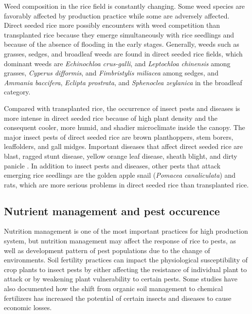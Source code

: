 \documentclass[12pt, oneside]{report}
\begin{document}
Weed composition in the rice field is constantly changing. Some weed species are favorably affected by production practice while some are adversely affected. Direct seeded rice more possibly encounters with weed competition than transplanted rice because they emerge simultaneously with rice seedlings and because of the absence of flooding in the early stages. Generally, weeds such as grasses, sedges, and broadleaf weeds are found in direct seeded rice fields, which dominant weeds are \textit{Echinochloa crus-galli}, and \textit{Leptochloa chinensis} among grasses, \textit{Cyperus difformis}, and \textit{Fimbristylis miliacea} among sedges, and \textit{Ammania baccifera}, \textit{Eclipta prostrata}, and \textit{Sphenoclea zeylanica} in the broadleaf category.

Compared with transplanted rice, the occurrence of insect pests and diseases is more intense in direct seeded rice because of high plant density and the consequent cooler, more humid, and shadier microclimate inside the canopy. The major insect pests of direct seeded rice are brown planthoppers, stem borers, leaffolders, and gall midges. Important diseases that affect direct seeded rice are blast, ragged stunt disease, yellow orange leaf disease, sheath blight, and dirty panicle \citep{pongprasert1995insect}. In addition to insect pests and diseases, other pests that attack emerging rice seedlings are the golden apple snail (\textit{Pomacea canaliculata}) and rats, which are more serious problems in direct seeded rice than transplanted rice. 

\subsection*{Nutrient management and pest occurence}

Nutrition management is one of the most important practices for high production system, but nutrition management may affect the response of rice to pests, as well as development pattern of pest populations due to the change of environments. Soil fertility practices can impact the physiological susceptibility of crop plants to insect pests by either affecting the resistance of individual plant to attack or by weakening plant vulnerability to certain pests. Some studies have also documented how the shift from organic soil management to chemical fertilizers has increased the potential of certain insects and diseases to cause economic losses.
\end{document}
